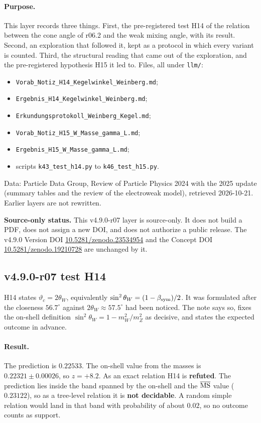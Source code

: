 \paragraph{Purpose.}
This layer records three things.  First, the pre-registered test H14 of the relation between the cone angle of r06.2 and
the weak mixing angle, with its result.  Second, an exploration that followed it, kept as a protocol in which every
variant is counted.  Third, the structural reading that came out of the exploration, and the pre-registered hypothesis
H15 it led to.  Files, all under \texttt{llm/}:
\begin{itemize}[leftmargin=2em]
\item \texttt{Vorab\_Notiz\_H14\_Kegelwinkel\_Weinberg.md};
\item \texttt{Ergebnis\_H14\_Kegelwinkel\_Weinberg.md};
\item \texttt{Erkundungsprotokoll\_Weinberg\_Kegel.md};
\item \texttt{Vorab\_Notiz\_H15\_W\_Masse\_gamma\_L.md};
\item \texttt{Ergebnis\_H15\_W\_Masse\_gamma\_L.md};
\item scripts \texttt{k43\_test\_h14.py} to \texttt{k46\_test\_h15.py}.
\end{itemize}
Data: Particle Data Group, Review of Particle Physics
2024 with the 2025 update (summary tables and the review of the electroweak model), retrieved 2026-10-21.  Earlier layers
are not rewritten.

\noindent\textbf{Source-only status.}
This v4.9.0-r07 layer is source-only.  It does not build a PDF, does not assign a new DOI,
and does not authorize a public release.  The v4.9.0 Version DOI
\href{https://doi.org/10.5281/zenodo.23534954}{10.5281/zenodo.23534954} and the Concept DOI
\href{https://doi.org/10.5281/zenodo.19210728}{10.5281/zenodo.19210728} are unchanged by it.

\subsection*{v4.9.0-r07 test H14}
\label{subsec:v490-r07-h14}

H14 states \(\vartheta_c=2\theta_W\), equivalently \(\sin^2\theta_W=(1-\beta_{\mathrm{sym}})/2\).  It was formulated after the closeness
\(56.7^\circ\) against \(2\theta_W\approx57.5^\circ\) had been noticed.  The note says so, fixes the on-shell definition
\(\sin^2\theta_W=1-m_W^2/m_Z^2\) as decisive, and states the expected outcome in advance.

\paragraph{Result.}
The prediction is \(0.22533\).  The on-shell value from the masses is \(0.22321\pm0.00026\), so \(z=+8.2\).  As an exact
relation H14 is \textbf{refuted}.  The prediction lies inside the band spanned by the on-shell and the
\(\overline{\rm MS}\) value (\(0.23122\)), so as a tree-level relation it is \textbf{not decidable}.  A random simple
relation would land in that band with probability of about \(0.02\), so no outcome counts as support.


